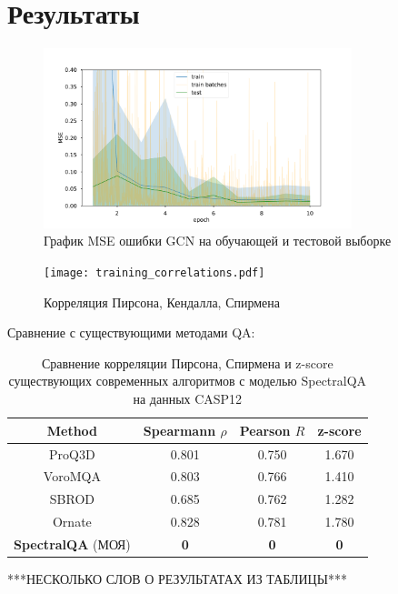 \documentclass[14pt]{extarticle}
\begin{document}
\section{Результаты}
\begin{figure}[H]
		\centering
		\includegraphics[width=0.8\textwidth]{training.pdf}
		\caption{График MSE ошибки GCN на обучающей и тестовой выборке}
		\label{fig:GCN}
	\end{figure}
\begin{figure}[H]
		\centering
		\texttt{[image: training\_correlations.pdf]}
		\caption{Корреляция Пирсона, Кендалла, Спирмена}
		\label{fig:correlation}
\end{figure}

Сравнение с существующими методами QA:

\begin{center}
	\begin{table}[h]
		\centering
		\begin{tabular}{cccc}
			\hline Method & Spearmann $\rho$ &  Pearson $R$ &  z-score \\
			\hline ProQ3D & 0.801 & 0.750 & 1.670 \\
			VoroMQA & 0.803 & 0.766 & 1.410 \\
			SBROD & 0.685 & 0.762  & 1.282 \\
			Ornate & 0.828 & 0.781  & 1.780 \\
			\textbf{SpectralQA} (МОЯ)&   \textbf{0}&   \textbf{0}   &  \textbf{0}    \\
			\hline 
		\end{tabular}
		\caption{Сравнение корреляции Пирсона, Спирмена и z-score существующих современных алгоритмов с моделью SpectralQA на данных CASP12}
		\label{Tab:1}
	\end{table}
\end{center}
***НЕСКОЛЬКО СЛОВ О РЕЗУЛЬТАТАХ ИЗ ТАБЛИЦЫ***
\end{document}
